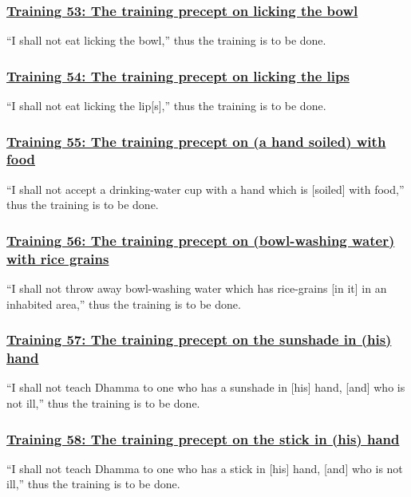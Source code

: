 \subsubsection*{\hyperref[sekh53]{Training 53: The training precept on licking the bowl}}
\label{training53}
``I shall not eat licking the bowl,'' thus the training is to be done.



\subsubsection*{\hyperref[sekh54]{Training 54: The training precept on licking the lips}}
\label{training54}
``I shall not eat licking the lip[s],'' thus the training is to be done.



\subsubsection*{\hyperref[sekh55]{Training 55: The training precept on (a hand soiled) with food}}
\label{training55}
``I shall not accept a drinking-water cup with a hand which is [soiled] with food,'' thus the training is to be done.



\subsubsection*{\hyperref[sekh56]{Training 56: The training precept on (bowl-washing water) with rice grains}}
\label{training56}
``I shall not throw away bowl-washing water which has rice-grains [in it] in an inhabited area,'' thus the training is to be done.



\subsubsection*{\hyperref[sekh57]{Training 57: The training precept on the sunshade in (his) hand}}
\label{training57}
``I shall not teach Dhamma to one who has a sunshade in [his] hand, [and] who is not ill,'' thus the training is to be done.



\subsubsection*{\hyperref[sekh58]{Training 58: The training precept on the stick in (his) hand}}
\label{training58}
``I shall not teach Dhamma to one who has a stick in [his] hand, [and] who is not ill,'' thus the training is to be done.



